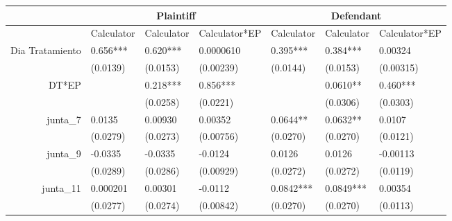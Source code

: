 \begin{tabular}{rrrrrrr}
\toprule
      & \multicolumn{3}{c}{Plaintiff} & \multicolumn{3}{c}{Defendant} \\
\midrule
      & \multicolumn{1}{c}{Calculator} & \multicolumn{1}{c}{Calculator} & \multicolumn{1}{c}{Calculator*EP} & \multicolumn{1}{c}{Calculator} & \multicolumn{1}{c}{Calculator} & \multicolumn{1}{c}{Calculator*EP} \\
Dia Tratamiento & \multicolumn{1}{l}{0.656***} & \multicolumn{1}{l}{0.620***} & \multicolumn{1}{l}{0.0000610} & \multicolumn{1}{l}{0.395***} & \multicolumn{1}{l}{0.384***} & \multicolumn{1}{l}{0.00324} \\
      & \multicolumn{1}{l}{(0.0139)} & \multicolumn{1}{l}{(0.0153)} & \multicolumn{1}{l}{(0.00239)} & \multicolumn{1}{l}{(0.0144)} & \multicolumn{1}{l}{(0.0153)} & \multicolumn{1}{l}{(0.00315)} \\
DT*EP & \multicolumn{1}{l}{} & \multicolumn{1}{l}{0.218***} & \multicolumn{1}{l}{0.856***} & \multicolumn{1}{l}{} & \multicolumn{1}{l}{0.0610**} & \multicolumn{1}{l}{0.460***} \\
      & \multicolumn{1}{l}{} & \multicolumn{1}{l}{(0.0258)} & \multicolumn{1}{l}{(0.0221)} & \multicolumn{1}{l}{} & \multicolumn{1}{l}{(0.0306)} & \multicolumn{1}{l}{(0.0303)} \\
junta\_7 & \multicolumn{1}{l}{0.0135} & \multicolumn{1}{l}{0.00930} & \multicolumn{1}{l}{0.00352} & \multicolumn{1}{l}{0.0644**} & \multicolumn{1}{l}{0.0632**} & \multicolumn{1}{l}{0.0107} \\
      & \multicolumn{1}{l}{(0.0279)} & \multicolumn{1}{l}{(0.0273)} & \multicolumn{1}{l}{(0.00756)} & \multicolumn{1}{l}{(0.0270)} & \multicolumn{1}{l}{(0.0270)} & \multicolumn{1}{l}{(0.0121)} \\
junta\_9 & \multicolumn{1}{l}{-0.0335} & \multicolumn{1}{l}{-0.0335} & \multicolumn{1}{l}{-0.0124} & \multicolumn{1}{l}{0.0126} & \multicolumn{1}{l}{0.0126} & \multicolumn{1}{l}{-0.00113} \\
      & \multicolumn{1}{l}{(0.0289)} & \multicolumn{1}{l}{(0.0286)} & \multicolumn{1}{l}{(0.00929)} & \multicolumn{1}{l}{(0.0272)} & \multicolumn{1}{l}{(0.0272)} & \multicolumn{1}{l}{(0.0119)} \\
junta\_11 & \multicolumn{1}{l}{0.000201} & \multicolumn{1}{l}{0.00301} & \multicolumn{1}{l}{-0.0112} & \multicolumn{1}{l}{0.0842***} & \multicolumn{1}{l}{0.0849***} & \multicolumn{1}{l}{0.00354} \\
      & \multicolumn{1}{l}{(0.0277)} & \multicolumn{1}{l}{(0.0274)} & \multicolumn{1}{l}{(0.00842)} & \multicolumn{1}{l}{(0.0270)} & \multicolumn{1}{l}{(0.0270)} & \multicolumn{1}{l}{(0.0113)} \\

\end{tabular}
